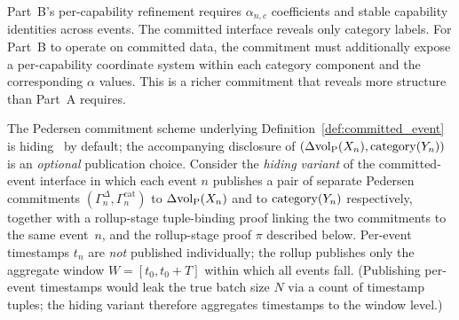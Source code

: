\begin{remark}
\label{rem:commit_part_b}
Part~B's per-capability refinement requires $\alpha_{n,c}$
coefficients and stable capability identities across events.
The committed interface reveals only category labels.
For Part~B to operate on committed data, the commitment must
additionally expose a per-capability coordinate system within
each category component and the corresponding $\alpha$ values.
This is a richer commitment that reveals more structure than
Part~A requires.
\end{remark}

\begin{proposition}
\label{prop:zk_aggregation}
The Pedersen commitment scheme underlying
Definition~\ref{def:committed_event} is
hiding~\citep[Definition~6]{lasser2026exo} by default; the
accompanying disclosure of $(\Delta{\operatorname{vol}_{\mathrm{P}}}(X_n), \mathrm{category}(Y_{n}))$ is an
\emph{optional} publication choice.  Consider the \emph{hiding
variant} of the committed-event interface in which each event
$n$ publishes a pair of separate Pedersen commitments
$(\Gamma^{\Delta}_n, \Gamma^{\mathrm{cat}}_n)$ to
$\Delta{\operatorname{vol}_{\mathrm{P}}}(X_n)$ and to $\mathrm{category}(Y_{n})$ respectively, together
with a rollup-stage tuple-binding proof linking the two
commitments to the same event~$n$, and the rollup-stage proof
$\pi$ described below.  Per-event timestamps $t_n$ are
\emph{not} published individually; the rollup publishes only
the aggregate window $W = [t_0, t_0 + T]$ within which all
events fall.  (Publishing per-event timestamps would leak the
true batch size $N$ via a count of timestamp tuples; the
hiding variant therefore aggregates timestamps to the window
level.)


\end{proposition}

